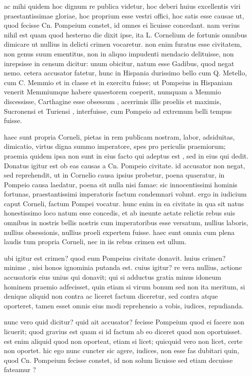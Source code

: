  ac mihi quidem hoc dignum re publica videtur, hoc deberi huius excellentis viri praestantissimae gloriae, hoc proprium esse vestri offici, hoc satis esse causae ut, quod fecisse Cn. Pompeium constet, id omnes ei licuisse concedant. nam verius nihil est quam quod hesterno die dixit ipse, ita L. Cornelium de fortunis omnibus dimicare ut nullius in delicti crimen vocaretur. non enim furatus esse civitatem, non genus suum ementitus, non in aliquo impudenti mendacio delituisse, non inrepsisse in censum dicitur: unum obicitur, natum esse Gadibus, quod negat nemo. cetera accusator fatetur, hunc in Hispania durissimo bello cum Q. Metello, cum C. Memmio et in classe et in exercitu fuisse; ut Pompeius in Hispaniam venerit Memmiumque habere quaestorem coeperit, numquam a Memmio discessisse, Carthagine esse obsessum , acerrimis illis proeliis et maximis, Sucronensi et Turiensi , interfuisse, cum Pompeio ad extremum belli tempus fuisse.

 haec sunt propria Corneli, pietas in rem publicam nostram, labor, adsiduitas, dimicatio, virtus digna summo imperatore, spes pro periculis praemiorum; praemia quidem ipsa non sunt in eius facto qui adeptus est , sed in eius qui dedit. Donatus igitur est ob eas causas a Cn. Pompeio civitate. id accusator non negat, sed reprehendit, ut in Cornelio causa ipsius probetur, poena quaeratur, in Pompeio causa laedatur, poena sit nulla nisi famae: sic innocentissimi hominis fortunas, praestantissimi imperatoris factum condemnari volunt. ergo in iudicium caput Corneli, factum Pompei vocatur. hunc enim in ea civitate in qua sit natus honestissimo loco natum esse concedis, et ab ineunte aetate relictis rebus suis omnibus in nostris bellis nostris cum imperatoribus esse versatum, nullius laboris, nullius obsessionis, nullius proeli expertem fuisse. haec sunt omnia cum plena laudis tum propria Corneli, nec in iis rebus crimen est ullum.

 ubi igitur est crimen? quod eum Pompeius civitate donavit. huius crimen? minime , nisi honos ignominia putanda est. cuius igitur? re vera nullius, actione accusatoris eius unius qui donavit; qui si adductus gratia minus idoneum hominem praemio adfecisset, quin etiam si virum bonum sed non ita meritum, si denique aliquid non contra ac liceret factum diceretur, sed contra atque oporteret, tamen esset omnis eius modi reprehensio a vobis, iudices, repudianda.

 nunc vero quid dicitur? quid ait accusator? fecisse Pompeium quod ei facere non licuerit; quod gravius est quam si id factum ab eo diceret quod non oportuisset. est enim aliquid quod non oporteat, etiam si licet; quicquid vero non licet, certe non oportet. hic ego nunc cuncter sic agere, iudices, non esse fas dubitari quin, quod Cn. Pompeium fecisse constet, id non solum licuisse sed etiam decuisse fateamur ?

